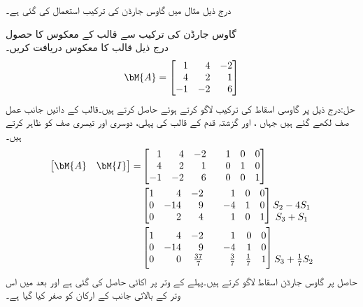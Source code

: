 درج ذیل مثال میں گاوس جارڈن کی ترکیب استعمال کی گئی ہے۔

\quad گاوس جارڈن کی ترکیب سے قالب کے معکوس کا حصول\\
درج ذیل قالب  کا معکوس  دریافت کریں۔
\begin{align*}
\bM{A}=\begin{bmatrix*}[r] 1&4&-2\\4&2&1\\-1&-2&6 \end{bmatrix*}
\end{align*}
حل:درج ذیل  پر گاوسی اسقاط کی ترکیب لاگو کرتے ہوئے  حاصل کرتے ہیں۔قالب کے دائیں جانب عمل صف لکھے گئے ہیں جہاں ،  اور  گزشتہ قدم کے قالب کی پہلی، دوسری اور تیسری صف کو ظاہر کرتے ہیں۔
\begin{align*}
\begin{bmatrix}\bM{A}&\bM{I}  \end{bmatrix}=&\begin{bmatrix*}[r] 1&4&-2&& 1&0&0\\4&2&1 && 0&1&0\\-1&-2&6 && 0&0&1\end{bmatrix*}\\
&\begin{bmatrix*}[r] 1&4&-2&& 1&0&0\\0&-14&9&&-4&1&0\\0&2&4&&1&0&1\end{bmatrix*}
\begin{matrix} \\S_2-4S_1\\S_3+S_1 \end{matrix}\\
&\begin{bmatrix*}[r] 1&4&-2&& 1&0&0\\0&-14&9&&-4&1&0\\0&0&\frac{37}{7}&&\frac{3}{7}&\frac{1}{7}&1\end{bmatrix*}
\begin{matrix} \\ \\S_3+\frac{1}{7}S_2 \end{matrix}
\end{align*}
حاصل  پر گاوس جارڈن اسقاط لاگو کرتے ہیں۔پہلے  کے وتر پر اکائی حاصل کی گئی ہے اور بعد میں اس وتر کے بالائی جانب  کے ارکان کو صفر کیا گیا ہے۔

